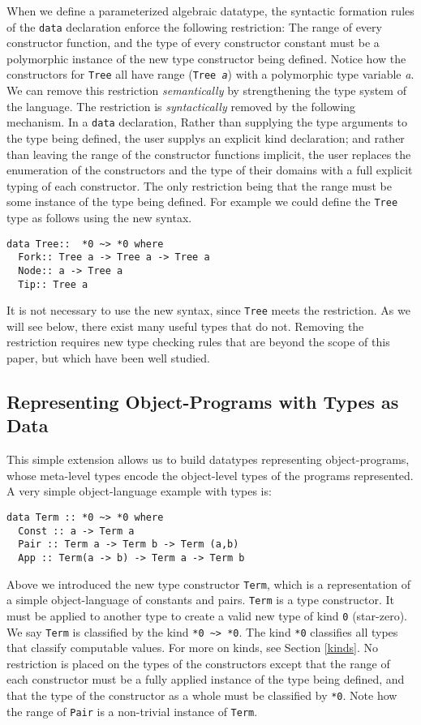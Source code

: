 \documentclass{sigplanconf}
\begin{document}
When we define a parameterized algebraic datatype, the syntactic formation
rules of the {\tt data} declaration enforce the following restriction: The
range of every constructor function, and the type of every constructor
constant must be a polymorphic instance of the new type constructor being
defined. Notice how the constructors for {\tt Tree} all have range ({\tt Tree
{\it a}}) with a polymorphic type variable {\it a}.  We can remove this
restriction {\it semantically} by strengthening the type system of the
language. The restriction is {\it syntactically} removed by the following
mechanism. In a {\tt data} declaration, 
Rather than supplying the type arguments to the type being defined,
the user supplys an explicit kind declaration; and
rather than leaving the range of the
constructor functions implicit, the user replaces the enumeration of the
constructors and the type of their domains with a full explicit typing of each
constructor. The only restriction being that the range must be some instance
of the type being defined. For example we could define the {\tt Tree}
type as follows using the new syntax.
\begin{verbatim}
data Tree::  *0 ~> *0 where
  Fork:: Tree a -> Tree a -> Tree a
  Node:: a -> Tree a
  Tip:: Tree a
\end{verbatim}
\noindent
It is not necessary to use the new syntax, since {\tt Tree} meets
the restriction. As we will see below, there exist many useful types
that do not. Removing the restriction requires new type checking rules that are
beyond the scope of this paper, but which have been well
studied\cite{wobbly,XiCheChe03,Hinze:03:Phantom}. 


\subsection{Representing Object-Programs with Types as Data}
This simple extension allows
us to build datatypes representing object-programs, whose
meta-level types encode the object-level types of the programs
represented. A very simple object-language example with types is:

\begin{verbatim}
data Term :: *0 ~> *0 where
  Const :: a -> Term a
  Pair :: Term a -> Term b -> Term (a,b)
  App :: Term(a -> b) -> Term a -> Term b
\end{verbatim}

Above we introduced the new type constructor {\tt Term}, which is a
representation of a simple object-language of constants and pairs. {\tt Term}
is a type constructor. It must be applied to another type to create a valid
new type of kind {\tt *0} (star-zero). We say {\tt Term} is classified by the kind
\verb+*0 ~> *0+. The kind \verb+*0+ classifies all types that classify
computable values. For more on kinds, see Section \ref{kinds}. No restriction
is placed on the types of the constructors except that the range of each
constructor must be a fully applied instance of the type being defined, and
that the type of the constructor as a whole must be classified by \verb+*0+.
Note how the range of {\tt Pair} is a non-trivial instance of {\tt Term}.
\end{document}
